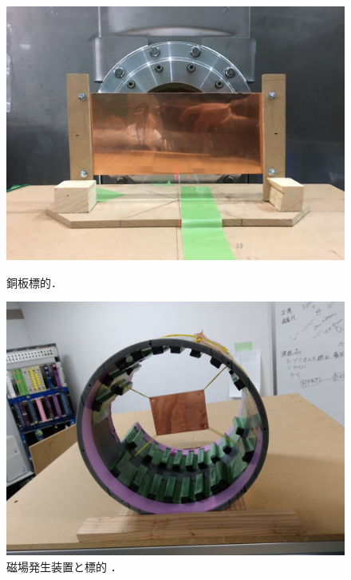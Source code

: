 \begin{figure}[H]
\begin{minipage}{0.45\hsize}
\begin{center}
\includegraphics[width=1\textwidth]{figure/tajima/cu_target.jpg}
\caption{銅板標的．}
\label{tar_cu}
\end{center}
\end{minipage}
\hfill
\begin{minipage}{0.45\hsize}
\begin{center}
\includegraphics[width=1\textwidth]{figure/tajima/mag.jpg}
\caption{磁場発生装置と標的 \protect\footnotemark．}
\label{tar_mag}
\end{center}
\end{minipage}
\end{figure}


